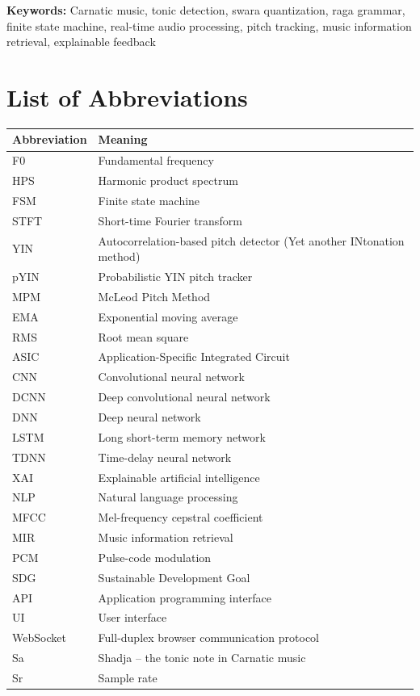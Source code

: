 \documentclass[12pt,a4paper]{report}
\numberwithin{equation}{chapter}
\begin{document}
\noindent\textbf{Keywords:} Carnatic music, tonic detection, swara quantization, raga grammar, finite state machine, real-time audio processing, pitch tracking, music information retrieval, explainable feedback

\newpage
\tableofcontents
\newpage
\listoftables
\newpage
\listoffigures
\newpage
\chapter*{List of Abbreviations}
\thispagestyle{romanstyle}
\begin{tabularx}{\textwidth}{|l|X|}
\hline
\textbf{Abbreviation} & \textbf{Meaning} \\
\hline
F0 & Fundamental frequency \\
HPS & Harmonic product spectrum \\
FSM & Finite state machine \\
STFT & Short-time Fourier transform \\
YIN & Autocorrelation-based pitch detector (Yet another INtonation method) \\
pYIN & Probabilistic YIN pitch tracker \\
MPM & McLeod Pitch Method \\
EMA & Exponential moving average \\
RMS & Root mean square \\
ASIC & Application-Specific Integrated Circuit \\
CNN & Convolutional neural network \\
DCNN & Deep convolutional neural network \\
DNN & Deep neural network \\
LSTM & Long short-term memory network \\
TDNN & Time-delay neural network \\
XAI & Explainable artificial intelligence \\
NLP & Natural language processing \\
MFCC & Mel-frequency cepstral coefficient \\
MIR & Music information retrieval \\
PCM & Pulse-code modulation \\
SDG & Sustainable Development Goal \\
API & Application programming interface \\
UI & User interface \\
WebSocket & Full-duplex browser communication protocol \\
Sa & Shadja -- the tonic note in Carnatic music \\
Sr & Sample rate \\
\hline
\end{tabularx}
\end{document}
